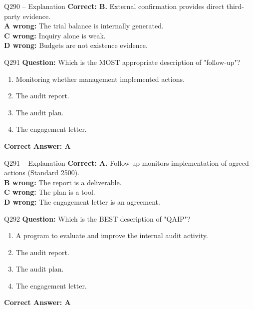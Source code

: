 \documentclass[aspectratio=169,10pt]{beamer}
\begin{document}
	\begin{frame}[t]{Q290 -- Explanation}
		\small
		\textbf{Correct: B.} External confirmation provides direct third-party evidence. \\[4pt]
		\textbf{A wrong:} The trial balance is internally generated. \\[2pt]
		\textbf{C wrong:} Inquiry alone is weak. \\[2pt]
		\textbf{D wrong:} Budgets are not existence evidence.
	\end{frame}
	
	\begin{frame}[t]{Q291}
		\small
		\textbf{Question:} Which is the MOST appropriate description of "follow-up"?
		\begin{enumerate}[label=\Alph*.,itemsep=1pt,topsep=2pt]
			\item Monitoring whether management implemented actions.
			\item The audit report.
			\item The audit plan.
			\item The engagement letter.
		\end{enumerate}
		\vspace{4pt}
		\textbf{Correct Answer: A}
	\end{frame}
	
	\begin{frame}[t]{Q291 -- Explanation}
		\small
		\textbf{Correct: A.} Follow-up monitors implementation of agreed actions (Standard 2500). \\[4pt]
		\textbf{B wrong:} The report is a deliverable. \\[2pt]
		\textbf{C wrong:} The plan is a tool. \\[2pt]
		\textbf{D wrong:} The engagement letter is an agreement.
	\end{frame}
	
	\begin{frame}[t]{Q292}
		\small
		\textbf{Question:} Which is the BEST description of "QAIP"?
		\begin{enumerate}[label=\Alph*.,itemsep=1pt,topsep=2pt]
			\item A program to evaluate and improve the internal audit activity.
			\item The audit report.
			\item The audit plan.
			\item The engagement letter.
		\end{enumerate}
		\vspace{4pt}
		\textbf{Correct Answer: A}
	\end{frame}
	
\end{document}
